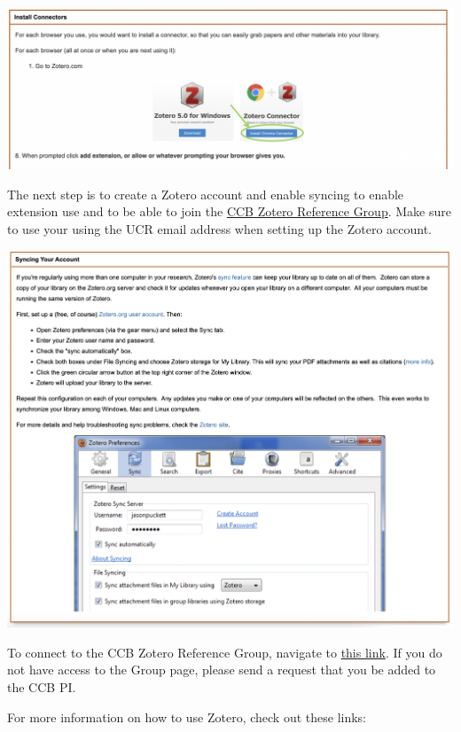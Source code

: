 \documentclass[
]{book}
\begin{document}
\begin{center}\includegraphics{images/zoteroextension} \end{center}

The next step is to create a Zotero account and enable syncing to enable extension use and to be able to join the \href{https://www.zotero.org/groups/4734848/ccbucr}{CCB Zotero Reference Group}. Make sure to use your using the UCR email address when setting up the Zotero account.

\begin{center}\includegraphics{images/zoterosyncing} \end{center}

To connect to the CCB Zotero Reference Group, navigate to \href{https://www.zotero.org/groups/4734848/ccbucr}{this link}. If you do not have access to the Group page, please send a request that you be added to the CCB PI.

For more information on how to use Zotero, check out these links:
\end{document}
